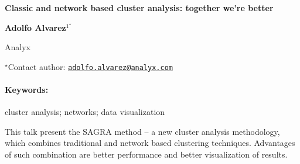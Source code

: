 \documentclass[11pt, a4paper]{article}
\renewcommand{\title}[1]{\begin{center}{\bf \LARGE #1}\end{center}}
\newcommand{\keywords}{\paragraph{Keywords:}}
\begin{document}
\pagestyle{empty}

\title{Classic and network based cluster analysis: together we're better}

\begin{center}
  {\bf Adolfo Alvarez$^{1^\star}$}
\end{center}

\vskip 0.3cm

\begin{affiliations}
\begin{enumerate}
\begin{minipage}{0.915\textwidth}
\centering
\item Analyx \\[-2pt]
\end{minipage}
\end{enumerate}
$^\star$Contact author: \href{mailto:adolfo.alvarez@analyx.com}{\nolinkurl{adolfo.alvarez@analyx.com}}\\
\end{affiliations}

\vskip 0.5cm

\begin{minipage}{0.915\textwidth}
\keywords cluster analysis; networks; data visualization
\end{minipage}

\vskip 0.8cm

This talk present the SAGRA method -- a new cluster analysis
methodology, which combines traditional and network based clustering
techniques. Advantages of such combination are better performance and
better visualization of results.
\end{document}
